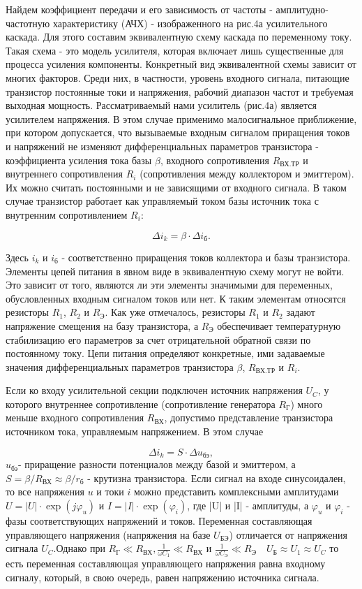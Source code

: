 Найдем коэффициент передачи и его зависимость от частоты - амплитудно-частотную характеристику (АЧХ) - изображенного на рис.4а усилительного каскада. Для этого составим эквивалентную схему каскада по переменному току. Такая схема - это модель усилителя, которая включает лишь существенные для процесса усиления компоненты. Конкретный вид эквивалентной схемы зависит от многих факторов. Среди них, в частности, уровень входного сигнала, питающие транзистор постоянные токи и
напряжения, рабочий диапазон частот и требуемая выходная мощность. Рассматриваемый нами усилитель (рис.4а) является усилителем напряжения. В этом случае применимо малосигнальное приближение, при котором допускается, что вызываемые входным
сигналом приращения токов и напряжений не изменяют дифференциальных параметров транзистора - коэффициента усиления тока базы $\beta$, входного сопротивления $R_{\text{ВХ.ТР}}$ и внутреннего сопротивления $R_i$ (сопротивления между коллектором и эмиттером). Их можно считать постоянными и не зависящими от входного сигнала. В таком случае транзистор работает как управляемый током базы источник тока с внутренним сопротивлением $R_i$:

$$\Delta i_k = \beta \cdot \Delta i_{\text{б}}.$$

Здесь $i_k$ и $i_{\text{б}}$ - соответственно приращения токов коллектора и базы транзистора. Элементы цепей питания в явном виде в эквивалентную схему могут не войти. Это зависит от того, являются ли эти элементы значимыми для переменных, обусловленных входным сигналом токов или нет. К таким элементам относятся резисторы $R_1$, $R_2$ и $R_{\text{Э}}$. Как уже отмечалось, резисторы $R_1$ и $R_2$ задают напряжение смещения на базу транзистора, а $R_{\text{Э}}$ обеспечивает температурную стабилизацию его параметров за счет отрицательной обратной связи по постоянному току. Цепи питания определяют конкретные, ими задаваемые значения дифференциальных параметров транзистора $\beta$, $R_{\text{ВХ.ТР}}$ и $R_i$.

Если ко входу усилительной секции подключен источник напряжения $U_C$, у которого внутреннее сопротивление (сопротивление генератора $R_{\text{Г}}$) много меньше входного сопротивления $R_{\text{ВХ}}$, допустимо представление транзистора источником тока, управляемым напряжением. В этом случае

$$\Delta i_k = S\cdot \Delta u_{\text{бэ}},$$
$u_{\text{бэ}}$- приращение разности потенциалов между базой и эмиттером, а $S=\beta/R_{\text{ВХ}} \approx \beta/r_{\text{б}}$ - крутизна транзистора. Если сигнал на входе
синусоидален, то все напряжения $u$ и токи $i$ можно представить
комплексными амплитудами $U=|U|\cdot \exp(j\varphi_u)$ и $I=|I|\cdot \exp(\varphi_i)$, где |U| и |I| - амплитуды, а $\varphi_u$ и $\varphi_i$ - фазы соответствующих напряжений и токов. Переменная составляющая управляющего напряжения (напряжения на базе $U_{\text{БЭ}}$) отличается от напряжения сигнала $U_C$.Однако при $R_{\text{Г}}\ll R_{\text{ВХ}},\frac{1}{\omega C_1}\ll R_{\text{ВХ}}$ и $\frac{1}{\omega C_{\text{Э}}}\ll R_{\text{Э}}$~~$U_{\text{Б}} \approx U_1 \approx U_C$ то есть переменная составляющая управляющего напряжения равна входному сигналу, который, в свою очередь, равен напряжению источника сигнала.

